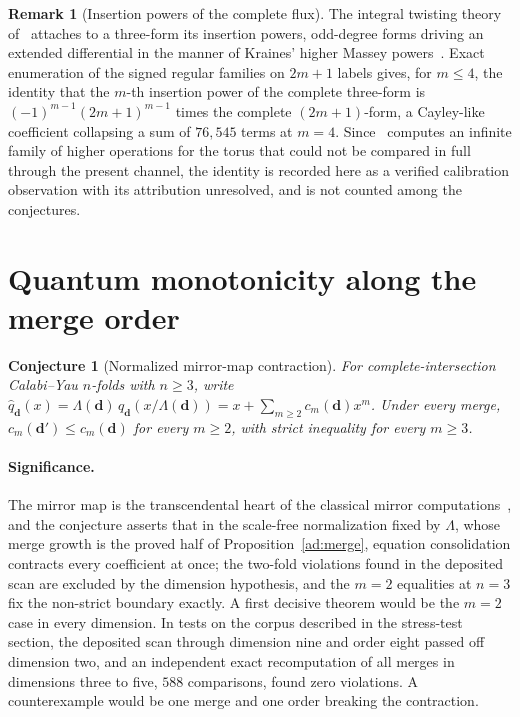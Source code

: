 \documentclass[11pt]{article}
\newtheorem{conjecture}{Conjecture}
\theoremstyle{definition}
\newtheorem{remarkx}{Remark}
\begin{document}
\begin{remarkx}[Insertion powers of the complete flux]\label{ad:kraines}
The integral twisting theory of~\cite{LME24} attaches to a three-form its insertion powers, odd-degree forms driving an extended differential in the manner of Kraines' higher Massey powers~\cite{Kra66}.  Exact enumeration of the signed regular families on $2m+1$ labels gives, for $m\le4$, the identity that the $m$-th insertion power of the complete three-form is $(-1)^{m-1}(2m+1)^{m-1}$ times the complete $(2m+1)$-form, a Cayley-like coefficient collapsing a sum of $76{,}545$ terms at $m=4$.  Since~\cite{LME24} computes an infinite family of higher operations for the torus that could not be compared in full through the present channel, the identity is recorded here as a verified calibration observation with its attribution unresolved, and is not counted among the conjectures.
\end{remarkx}

\section{Quantum monotonicity along the merge order}

\begin{conjecture}[Normalized mirror-map contraction]\label{ad5}
For complete-intersection Calabi--Yau $n$-folds with $n\ge3$, write $\hat q_{\mathbf d}(x)=\Lambda(\mathbf d)\,q_{\mathbf d}(x/\Lambda(\mathbf d))=x+\sum_{m\ge2}c_m(\mathbf d)x^m$.  Under every merge, $c_m(\mathbf d')\le c_m(\mathbf d)$ for every $m\ge2$, with strict inequality for every $m\ge3$.
\end{conjecture}

\paragraph{Significance.}
The mirror map is the transcendental heart of the classical mirror computations~\cite{HKTY95,Zin14}, and the conjecture asserts that in the scale-free normalization fixed by $\Lambda$, whose merge growth is the proved half of Proposition~\ref{ad:merge}, equation consolidation contracts every coefficient at once; the two-fold violations found in the deposited scan are excluded by the dimension hypothesis, and the $m=2$ equalities at $n=3$ fix the non-strict boundary exactly.  A first decisive theorem would be the $m=2$ case in every dimension.  In tests on the corpus described in the stress-test section, the deposited scan through dimension nine and order eight passed off dimension two, and an independent exact recomputation of all merges in dimensions three to five, $588$ comparisons, found zero violations.  A counterexample would be one merge and one order breaking the contraction.
\end{document}

